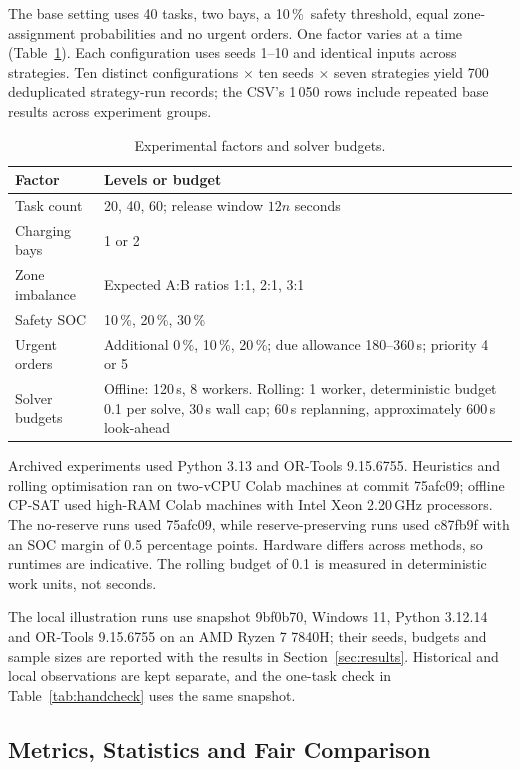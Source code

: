\documentclass[11pt,a4paper]{article}
\newcommand{\pct}{\,\%}
\begin{document}
The base setting uses 40 tasks, two bays, a 10\pct\ safety threshold, equal zone-assignment
probabilities and no urgent orders. One factor varies at a time (Table~\ref{tab:factors}). Each
configuration uses seeds 1--10 and identical inputs across strategies. Ten distinct configurations
$\times$ ten seeds $\times$ seven strategies yield 700 deduplicated strategy-run records; the CSV's
1\,050 rows include repeated base results across experiment groups.

\begin{table}[!htbp]
\centering\small
\caption{Experimental factors and solver budgets.}
\label{tab:factors}
\begin{tabularx}{\linewidth}{lX}
\toprule
Factor & Levels or budget \\
\midrule
Task count & 20, 40, 60; release window $12n$ seconds \\
Charging bays & 1 or 2 \\
Zone imbalance & Expected A:B ratios 1:1, 2:1, 3:1 \\
Safety SOC & 10\pct, 20\pct, 30\pct \\
Urgent orders & Additional 0\pct, 10\pct, 20\pct; due allowance 180--360\,s; priority 4 or 5 \\
Solver budgets & Offline: 120\,s, 8 workers. Rolling: 1 worker, deterministic budget 0.1 per solve,
30\,s wall cap; 60\,s replanning, approximately 600\,s look-ahead \\
\bottomrule
\end{tabularx}
\end{table}

Archived experiments used Python 3.13 and OR-Tools 9.15.6755. Heuristics and rolling optimisation ran
on two-vCPU Colab machines at commit 75afc09; offline CP-SAT used high-RAM Colab machines with Intel
Xeon 2.20\,GHz processors. The no-reserve runs used 75afc09, while reserve-preserving runs used c87fb9f
with an SOC margin of 0.5 percentage points. Hardware differs across methods, so runtimes are
indicative. The rolling budget of 0.1 is measured in deterministic work units, not seconds.

The local illustration runs use snapshot 9bf0b70, Windows 11, Python 3.12.14 and OR-Tools 9.15.6755
on an AMD Ryzen 7 7840H; their seeds, budgets and sample sizes are reported with the results in
Section~\ref{sec:results}. Historical and local observations are kept separate, and the one-task check
in Table~\ref{tab:handcheck} uses the same snapshot.

\subsection{Metrics, Statistics and Fair Comparison}
\end{document}
